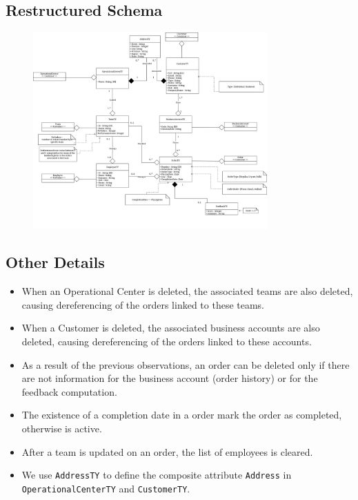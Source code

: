 \subsection*{Restructured Schema}
\begin{figure}[H]
    \centering
    \includegraphics[width=0.8\textwidth]{img/UML.jpg}
\end{figure}

\subsection*{Other Details}
\begin{itemize}[label=-]
    \item When an Operational Center is deleted, the associated teams are also deleted, causing dereferencing of the orders linked to these teams.
    \item When a Customer is deleted, the associated business accounts are also deleted, causing dereferencing of the orders linked to these accounts.
    \item As a result of the previous observations, an order can be deleted only if there are not information for the business account (order history) or for the feedback computation.
    \item The existence of a completion date in a order mark the order as completed, otherwise is active.
    \item After a team is updated on an order, the list of employees is cleared.
    \item We use \texttt{AddressTY} to define the composite attribute \texttt{Address} in \texttt{OperationalCenterTY} and \texttt{CustomerTY}.
\end{itemize}